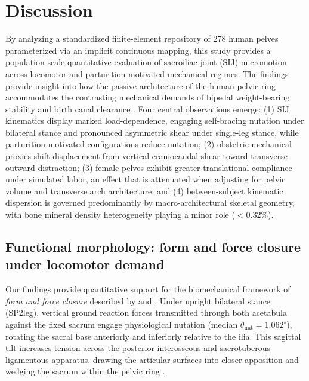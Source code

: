 \section{Discussion}
By analyzing a standardized finite-element repository of 278 human pelves parameterized via an implicit continuous mapping, this study provides a population-scale quantitative evaluation of sacroiliac joint (SIJ) micromotion across locomotor and parturition-motivated mechanical regimes. The findings provide insight into how the passive architecture of the human pelvic ring accommodates the contrasting mechanical demands of bipedal weight-bearing stability and birth canal clearance \citep{Washburn1960,Ruff2017,Pavlicev2020}. Four central observations emerge: (1) SIJ kinematics display marked load-dependence, engaging self-bracing nutation under bilateral stance and pronounced asymmetric shear under single-leg stance, while parturition-motivated configurations reduce nutation; (2) obstetric mechanical proxies shift displacement from vertical craniocaudal shear toward transverse outward distraction; (3) female pelves exhibit greater translational compliance under simulated labor, an effect that is attenuated when adjusting for pelvic volume and transverse arch architecture; and (4) between-subject kinematic dispersion is governed predominantly by macro-architectural skeletal geometry, with bone mineral density heterogeneity playing a minor role ($<0.32\%$).

\subsection*{Functional morphology: form and force closure under locomotor demand}
Our findings provide quantitative support for the biomechanical framework of \emph{form and force closure} described by \citet{Vleeming2012} and \citet{Snijders1993}. Under upright bilateral stance (SP2leg), vertical ground reaction forces transmitted through both acetabula against the fixed sacrum engage physiological nutation (median $\theta_{\text{nut}} = 1.062^\circ$), rotating the sacral base anteriorly and inferiorly relative to the ilia. This sagittal tilt increases tension across the posterior interosseous and sacrotuberous ligamentous apparatus, drawing the articular surfaces into closer apposition and wedging the sacrum within the pelvic ring \citep{Snijders1993,Hammer2013,Kiapour2019}.

